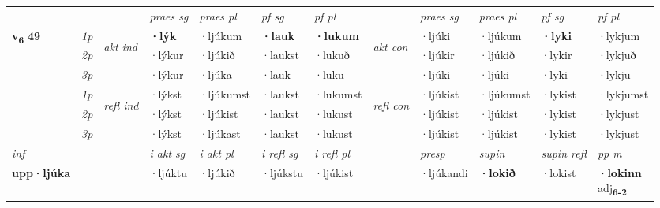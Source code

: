 \begin{longtable}[l]{X>{\footnotesize\itshape}llXXXXlXXXX}
\midrule

 & &   & \textit{praes sg}  & \textit{praes pl}    & \textit{ pf sg} & \textit{pf pl} & & \textit{praes sg}  & \textit{praes pl}    & \textit{pf sg} & \textit{pf pl }  \\ \cmidrule{4-7} \cmidrule{9-12}
 \multirow{2}{*}{{{\textbf{v{\textsubscript{6}}} \Large{\textbf{49}}}}}  & 1p & \multirow{3}{*}{\begin{turn}{90}\textit{akt ind}\end{turn}} & \textbf{·lýk} & ·ljúkum & \textbf{·lauk} & \textbf{·lukum} & \multirow{3}{*}{\begin{turn}{90}\textit{akt con}\end{turn}} &·ljúki & ·ljúkum & \textbf{·lyki} & ·lykjum\\*
 & 2p &  &  ·lýkur  & ·ljúkið & ·laukst & ·lukuð & & ·ljúkir & ·ljúkið & ·lykir & ·lykjuð \\*
 & 3p &  & ·lýkur & ·ljúka & ·lauk & ·luku & & ·ljúki & ·ljúki& ·lyki & ·lykju \\*
\cmidrule{4-7} \cmidrule{9-12}
 & 1p & \multirow{3}{*}{\begin{turn}{90}\textit{refl ind}\end{turn}}  & ·lýkst & ·ljúkumst & ·laukst & ·lukumst & \multirow{3}{*}{\begin{turn}{90}\textit{refl con}\end{turn}}  &·ljúkist & ·ljúkumst & ·lykist & ·lykjumst \\*
 & 2p &  & ·lýkst & ·ljúkist & ·laukst & ·lukust & &·ljúkist & ·ljúkist & ·lykist & ·lykjust \\*
 & 3p  & & ·lýkst & ·ljúkast & ·laukst & ·lukust & & ·ljúkist & ·ljúkist& ·lykist & ·lykjust \\*
\cmidrule{4-7} \cmidrule{9-12}

   {\textit{inf}} & &  & \textit{i akt sg} & \textit{i akt pl} & \textit{i refl sg} & \textit{i refl pl} && \textit{presp} & \textit{supin} & \textit{supin refl} & \textit{pp m} \\*
  {\textbf{upp\allowbreak ·ljúka}} & && ·ljúktu  & ·ljúkið & ·ljúkstu & ·ljúkist && ·ljúkandi &  \textbf{·lokið} & ·lokist & \specialcell{\textbf{·lokinn} \\ adj\textbf{\textsubscript{6-2}}} \\*

\midrule


\end{longtable}
